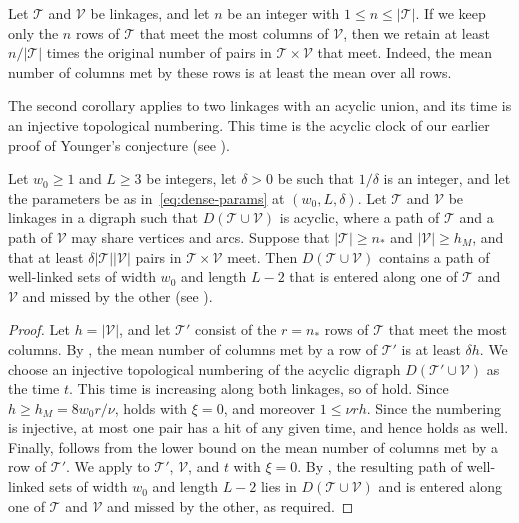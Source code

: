 \documentclass[fontsize=12pt,leading=14pt]{fullpaper}
\newcommand{\Tcal}{\mathcal{T}}
\newcommand{\Vcal}{\mathcal{V}}
\begin{document}
\begin{observation}\label{obs:dens-rows}
  Let $\Tcal$ and $\Vcal$ be linkages, and let $n$ be an integer with $1\le n\le|\Tcal|$.
  If we keep only the $n$ rows of $\Tcal$ that meet the most columns of $\Vcal$, then we retain at least $n/|\Tcal|$ times the original number of pairs in $\Tcal\times\Vcal$ that meet.
  Indeed, the mean number of columns met by these rows is at least the mean over all rows.
\end{observation}

The second corollary applies to two linkages with an acyclic union, and its time is an injective topological numbering.
This time is the acyclic clock of our earlier proof of Younger's conjecture (see ).

\begin{corollary}\label{cor:acyclic}
  Let $w_0\ge1$ and $L\ge3$ be integers, let $\delta>0$ be such that $1/\delta$ is an integer, and let the parameters be as in~\eqref{eq:dense-params} at $(w_0,L,\delta)$.
  Let $\Tcal$ and $\Vcal$ be linkages in a digraph such that $D(\Tcal\cup\Vcal)$ is acyclic, where a path of $\Tcal$ and a path of $\Vcal$ may share vertices and arcs.
  Suppose that $|\Tcal|\ge n_*$ and $|\Vcal|\ge h_M$, and that at least $\delta|\Tcal||\Vcal|$ pairs in $\Tcal\times\Vcal$ meet.
  Then $D(\Tcal\cup\Vcal)$ contains a path of well-linked sets of width $w_0$ and length $L-2$ that is entered along one of $\Tcal$ and $\Vcal$ and missed by the other (see ).
\end{corollary}

\begin{proof}
  Let $h=|\Vcal|$, and let $\Tcal'$ consist of the $r=n_*$ rows of $\Tcal$ that meet the most columns.
  By , the mean number of columns met by a row of $\Tcal'$ is at least $\delta h$.
  We choose an injective topological numbering of the acyclic digraph $D(\Tcal'\cup\Vcal)$ as the time $t$.
  This time is increasing along both linkages, so  of  hold.
  Since $h\ge h_M=8w_0r/\nu$,  holds with $\xi=0$, and moreover $1\le\nu rh$.
  Since the numbering is injective, at most one pair has a hit of any given time, and hence  holds as well.
  Finally,  follows from the lower bound on the mean number of columns met by a row of $\Tcal'$.
  We apply  to $\Tcal'$, $\Vcal$, and $t$ with $\xi=0$.
  By , the resulting path of well-linked sets of width $w_0$ and length $L-2$ lies in $D(\Tcal\cup\Vcal)$ and is entered along one of $\Tcal$ and $\Vcal$ and missed by the other, as required.
\end{proof}
\end{document}
